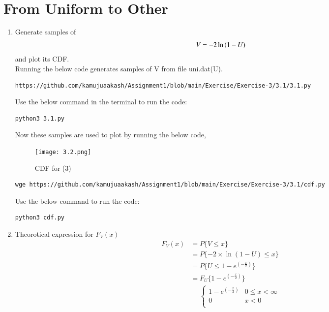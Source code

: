 \documentclass[journal,12pt,twocolumn]{IEEEtran}
\renewcommand\thesection{\arabic{section}}
\begin{document}
\section{From Uniform to Other}
\begin{enumerate}[label=\thesection.\arabic*,ref=\thesection.\theenumi]
\item
Generate samples of 
%
\begin{equation}
V = -2\ln\left(1-U\right)
\end{equation}
%
and plot its CDF.\\ 
\solution
Running the below code generates samples of V from file uni.dat(U).
\begin{lstlisting}
https://github.com/kamujuaakash/Assignment1/blob/main/Exercise/Exercise-3/3.1/3.1.py
\end{lstlisting}
Use the below command in the terminal to run the code:
\begin{lstlisting}
python3 3.1.py
\end{lstlisting}
Now these samples are used to plot  by running the below code,
 \begin{figure}[!h]
\texttt{[image: 3.2.png]}
\caption{CDF for (3)}
\label{fig:V}
\end{figure}
\begin{lstlisting}
wge https://github.com/kamujuaakash/Assignment1/blob/main/Exercise/Exercise-3/3.1/cdf.py
\end{lstlisting}
Use the below command to run the code:
\begin{lstlisting}
python3 cdf.py
\end{lstlisting}
\item
Theorotical expression for $F_V (x)$
\begin{align*}
    F_V (x) &= P\{V \le x\} \\
            &= P\{-2\times \ln{(1-U)} \le x\} \\
            &= P\{U \le 1 - e^{(-\frac{x}{2})}\} \\ 
            &= F_U\{1- e^{(-\frac{x}{2})} \}\\
            &=
\begin{cases}
 1 - e^{(-\frac{x}{2})} & 0 \le x < \infty \\
 0  & x<0 \\
 \end{cases}
\end{align*} 
\end{enumerate}
\end{document}
